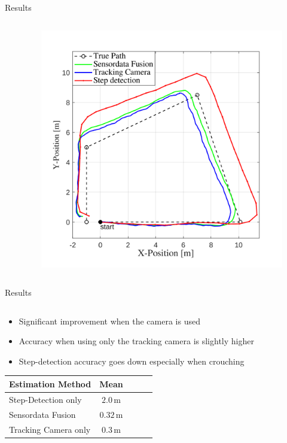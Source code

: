 \documentclass[aspectratio=169,handout]{beamer}
\begin{document}
{\begin{frame}{Results}
\begin{columns}
\begin{column}{0.45\textwidth}
			\end{column}
			\begin{column}{0.54\textwidth}
				\begin{figure}
					\centering
					\includegraphics[width=0.9\linewidth]{../Conference_Paper/Path2}
				\end{figure}
				
			\end{column}
			
			
			
		\end{columns}
	\end{frame}
	
		
		\begin{frame}{Results}
		\begin{columns}
			\begin{column}{0.45\textwidth}
				\begin{itemize}
					\item Significant improvement when the camera is used
					\item Accuracy when using only the tracking camera is slightly higher %
					\item Step-detection accuracy goes down especially when crouching
				\end{itemize}
				
					\begin{tabular}{lcccc}
					\toprule
					\textbf{Estimation Method}                  &   \textbf{Mean}      \\ \midrule
					Step-Detection only                              & $2.0\,\mathrm{m}$   \\
					Sensordata Fusion                           & $0.32\,\mathrm{m}$   \\
					Tracking Camera only & $0.3\,\mathrm{m}$  \\ \bottomrule
				\end{tabular}


\end{column}
\end{columns}
\end{frame}}
\end{document}
